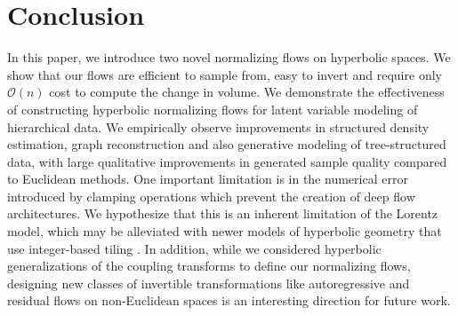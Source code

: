 \section{Conclusion}
In this paper, we introduce two novel normalizing flows on hyperbolic spaces. 
We show that our flows are efficient to sample from, easy to invert and require only $\mathcal{O}(n)$ cost to compute the change in volume. We demonstrate the effectiveness of constructing hyperbolic normalizing flows for latent variable modeling of hierarchical data. We empirically observe improvements in structured density estimation, graph reconstruction and also generative modeling of tree-structured data, with large qualitative improvements in generated sample quality compared to Euclidean methods. One important limitation is in the numerical error introduced by clamping operations which prevent the creation of deep flow architectures. We hypothesize that this is an inherent limitation of the Lorentz model, which may be alleviated with newer models of hyperbolic geometry that use integer-based tiling \cite{yu2019numerically}. In addition, while we considered hyperbolic generalizations of the coupling transforms to define our normalizing flows, designing new classes of invertible transformations like autoregressive and residual flows on non-Euclidean spaces is an interesting direction for future work.
